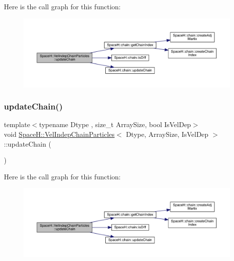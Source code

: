 Here is the call graph for this function\+:
\nopagebreak
\begin{figure}[H]
\begin{center}
\leavevmode
\includegraphics[width=350pt]{class_space_h_1_1_vel_indep_chain_particles_a06d1ed1c4eaef6229aabf5ad3f2de45d_cgraph}
\end{center}
\end{figure}
\mbox{\label{class_space_h_1_1_vel_indep_chain_particles_a06d1ed1c4eaef6229aabf5ad3f2de45d}} 
\subsubsection{\texorpdfstring{update\+Chain()}{updateChain()}\hspace{0.1cm}{\footnotesize\ttfamily [2/2]}}
{\footnotesize\ttfamily template$<$typename Dtype , size\+\_\+t Array\+Size, bool Is\+Vel\+Dep$>$ \\
void \mbox{\hyperlink{class_space_h_1_1_vel_indep_chain_particles}{Space\+H\+::\+Vel\+Indep\+Chain\+Particles}}$<$ Dtype, Array\+Size, Is\+Vel\+Dep $>$\+::update\+Chain (\begin{DoxyParamCaption}{ }\end{DoxyParamCaption})\hspace{0.3cm}{\ttfamily [inline]}}

Here is the call graph for this function\+:
\nopagebreak
\begin{figure}[H]
\begin{center}
\leavevmode
\includegraphics[width=350pt]{class_space_h_1_1_vel_indep_chain_particles_a06d1ed1c4eaef6229aabf5ad3f2de45d_cgraph}
\end{center}
\end{figure}
\mbox{\label{class_space_h_1_1_vel_indep_chain_particles_aadbc08f6cf8da3e46eb8d6c619e30c2f}} 
